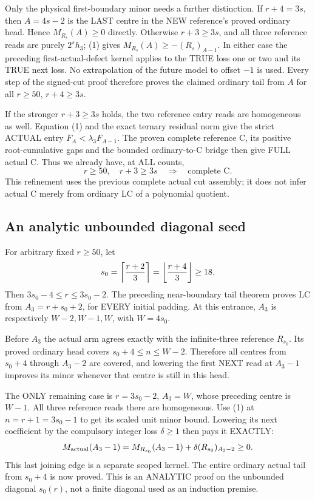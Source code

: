 Only the physical first-boundary minor needs a further distinction.
If $r+4=3s$, then $A=4s-2$ is the LAST centre in the NEW reference's
proved ordinary head. Hence $M_{R_s}(A)\ge0$ directly.
Otherwise $r+3\ge3s$, and all three reference reads are purely
$2^s h_3$; (1) gives $M_{R_s}(A)\ge-(R_s)_{A-1}$.
In either case the preceding first-actual-defect kernel applies to
the TRUE loss one or two and its TRUE next loss. No extrapolation
of the future model to offset $-1$ is used.
Every step of the signed-cut proof therefore proves the claimed
ordinary tail from $A$ for all $r\ge50$, $r+4\ge3s$.

If the stronger $r+3\ge3s$ holds, the two reference entry reads are
homogeneous as well. Equation (1) and the exact ternary residual norm
give the strict ACTUAL entry $F_A<\lambda_3F_{A-1}$.
The proven complete reference C, its positive root-cumulative gaps
and the bounded ordinary-to-C bridge then give FULL actual C.
Thus we already have, at ALL counts,
\[
 r\ge50,\quad r+3\ge3s\quad\Longrightarrow\quad\text{complete C}. \tag{2}
\]
This refinement uses the previous complete actual cut assembly;
it does not infer actual C merely from ordinary LC of a polynomial
quotient.

\subsection{An analytic unbounded diagonal seed}
For arbitrary fixed $r\ge50$, let
\[
 s_0=\left\lceil{r+2\over3}\right\rceil
                     =\left\lfloor{r+4\over3}\right\rfloor\ge18.
\]
Then $3s_0-4\le r\le3s_0-2$. The preceding near-boundary tail
theorem proves LC from $A_3=r+s_0+2$, for EVERY initial padding.
At this entrance, $A_3$ is respectively $W-2,W-1,W$, with $W=4s_0$.

Before $A_3$ the actual arm agrees exactly with the infinite-three
reference $R_{s_0}$. Its proved ordinary head covers
$s_0+4\le n\le W-2$. Therefore all centres from $s_0+4$ through
$A_3-2$ are covered, and lowering the first NEXT read at $A_3-1$
improves its minor whenever that centre is still in this head.

The ONLY remaining case is $r=3s_0-2$, $A_3=W$, whose preceding
centre is $W-1$. All three reference reads there are homogeneous.
Use (1) at $n=r+1=3s_0-1$ to get its scaled unit minor bound.
Lowering its next coefficient by the compulsory integer loss
$\delta\ge1$ then pays it EXACTLY:
\[
 M_{\rm actual}(A_3-1)
       =M_{R_{s_0}}(A_3-1)+\delta(R_{s_0})_{A_3-2}\ge0.
\]
This last joining edge is a separate scoped kernel.
The entire ordinary actual tail from $s_0+4$ is now proved.
This is an ANALYTIC proof on the unbounded diagonal $s_0(r)$,
not a finite diagonal used as an induction premise.

